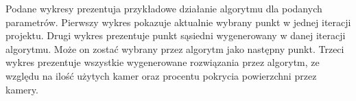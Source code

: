 \documentclass[12pt,a4paper]{article}
\begin{document}
\begin{landscape}
\pagestyle{empty}
\begin{figure}
\begin{floatrow}
       }
       \ffigbox[\FBwidth]{\caption{MediumMap,
       $d_p=1$, $d_k=0.1$, $skala=5$}\label{fig-4}}{%
         \texttt{[image: \{mediumMap\_1\_0.1\_5]}.png}
       }
       \end{floatrow}
\end{figure}
\end{landscape}

Podane wykresy prezentuja przykładowe działanie algorytmu
dla podanych parametrów. Pierwszy wykres pokazuje aktualnie wybrany punkt
w jednej iteracji projektu. Drugi wykres prezentuje punkt sąsiedni wygenerowany
w danej iteracji algorytmu. Może on zostać wybrany przez algorytm
jako następny punkt. Trzeci wykres prezentuje wszystkie wygenerowane rozwiązania
przez algorytm, ze względu na ilość użytych kamer oraz procentu pokrycia
powierzchni przez kamery.
\end{document}
